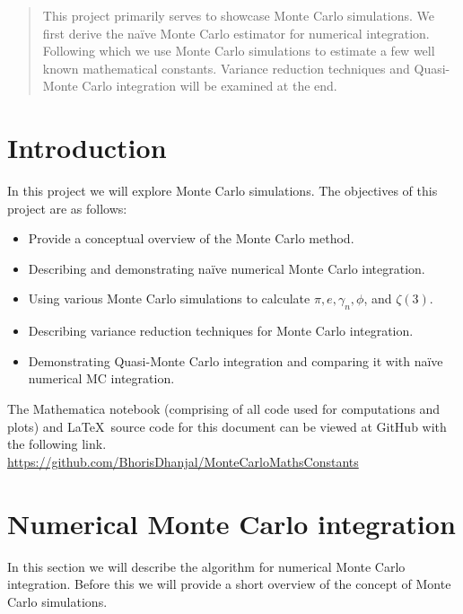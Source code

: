 \documentclass[12pt]{article}
\makeatletter
\numberwithin{equation}{section}
\newcommand\mainmatter{%
    \cleardoublepage
  \pagenumbering{arabic}}
\makeatother
\begin{document}
\mainmatter
\maketitle
\begin{abstract}
    This project primarily serves to showcase Monte Carlo simulations. We first derive the naïve Monte Carlo estimator for numerical integration. Following which we use Monte Carlo simulations to estimate a few well known mathematical constants. Variance reduction techniques and Quasi-Monte Carlo integration will be examined at the end.
\end{abstract}
\section{Introduction} %
In this project we will explore Monte Carlo simulations.
The objectives of this project are as follows:
\begin{itemize}
    \item Provide a conceptual overview of the Monte Carlo method.
    \item Describing and demonstrating naïve numerical Monte Carlo integration.
    \item Using various Monte Carlo simulations to calculate $\pi, e, \gamma_n, \phi$, and $\zeta (3)$.
    \item Describing variance reduction techniques for Monte Carlo integration.
    \item Demonstrating Quasi-Monte Carlo integration and comparing it with naïve numerical MC integration.
\end{itemize}\par
The Mathematica notebook (comprising of all code used for computations and plots) and \LaTeX \ source code for this document can be viewed at GitHub with the following link.\\
\href{https://github.com/BhorisDhanjal/reciprocal-multifactorial-constants}{\faGithubSquare} \href{https://github.com/BhorisDhanjal/MonteCarloMathsConstants}{https://github.com/BhorisDhanjal/MonteCarloMathsConstants}
\vfill
\section{Numerical Monte Carlo integration}
In this section we will describe the algorithm for numerical Monte Carlo integration. Before this we will provide a short overview of the concept of Monte Carlo simulations.
\end{document}
